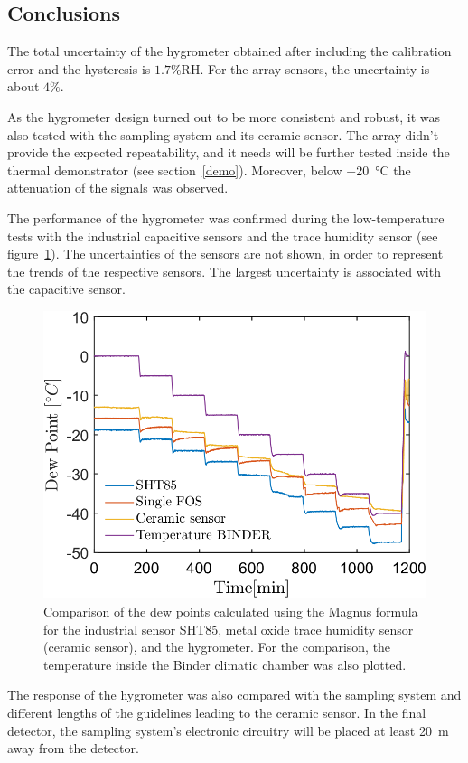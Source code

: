 \subsection{Conclusions}
The total uncertainty of the hygrometer obtained after including the calibration error and the hysteresis is $1.7$\%RH. For the array sensors, the uncertainty is about $4\%$.


As the hygrometer design turned out to be more consistent and robust, it was also tested with the sampling system and its ceramic sensor. The array didn't provide the expected repeatability, and it needs will be further tested inside the thermal demonstrator (see section~\ref{demo}). Moreover, below \SI{-20}{\celsius} the attenuation of the signals was observed.

The performance of the hygrometer was confirmed during the low-temperature tests with the industrial capacitive sensors and the trace humidity sensor (see figure~\ref{fig_comparison}). The uncertainties of the sensors are not shown, in order to represent the trends of the respective sensors. The largest uncertainty is associated with the capacitive sensor. 
\begin{figure}[!h]
\centering
\includegraphics[width=0.6\columnwidth]{Chapter5/images/DPCPercent.png}
\caption{Comparison of the dew points calculated using the Magnus formula for the industrial sensor SHT85, metal oxide trace humidity sensor (ceramic sensor), and the hygrometer. For the comparison, the temperature inside the Binder climatic chamber was also plotted.}
\label{fig_comparison}
\end{figure}

The response of the hygrometer was also compared with the sampling system and different lengths of the guidelines leading to the ceramic sensor. In the final detector, the sampling system's electronic circuitry will be placed at least \SI{20}{\metre} away from the detector. 


